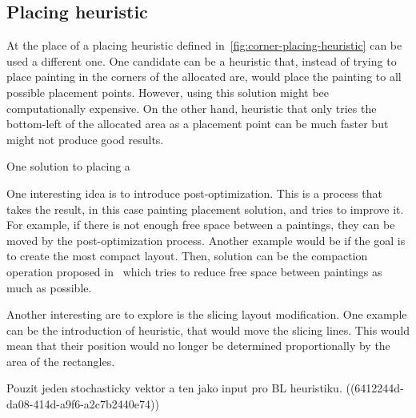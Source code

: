 \subsection{Placing heuristic}\label{subsec:placing-heuristic}

At the place of a placing heuristic defined in~\ref{fig:corner-placing-heuristic} can be used a different one.
One candidate can be a heuristic that, instead of trying to place painting in the corners of the allocated are,
would place the painting to all possible placement points.
However, using this solution might bee computationally expensive.
On the other hand, heuristic that only tries the bottom-left of the allocated area as a placement point can be much faster but
might not produce good results.

One solution to placing a


One interesting idea is to introduce post-optimization.
This is a process that takes the result, in this case painting placement solution,
and tries to improve it.
For example, if there is not enough free space between a paintings, they can be moved by the post-optimization process.
Another example would be if the goal is to create the most compact layout.
Then, solution can be the compaction operation proposed in~\cite{laiSlicingTreeComplete2001}
which tries to reduce free space between paintings as much as possible.


Another interesting are to explore is the slicing layout modification.
One example can be the introduction of heuristic, that would move the slicing lines.
This would mean that their position would no longer be determined proportionally by the area of the rectangles.


Pouzit jeden stochasticky vektor a ten jako input pro BL heuristiku.
((6412244d-da08-414d-a9f6-a2c7b2440e74))








